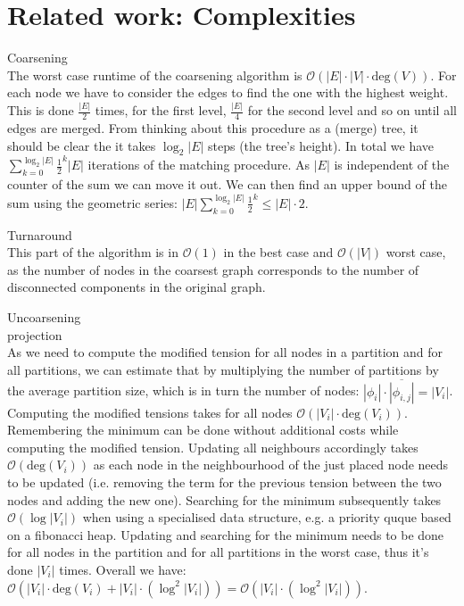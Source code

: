 \section{Related work: Complexities} 
Coarsening \\
    The worst case runtime of the coarsening algorithm is $\mathcal{O}(|E| \cdot |V| \cdot \text{deg}(V))$.
    For each node we have to consider the edges to find the one with the highest weight. 
    This is done $\frac{|E|}{2}$ times, for the first level, $\frac{|E|}{4}$ for the second level and so on until all edges are merged.
    From thinking about this procedure as a (merge) tree, it should be clear the it takes $\log_2 |E|$ steps (the tree's height). 
    In total we have $\sum_{k = 0}^{\log_2 |E|} \frac{1}{2}^k |E|$ iterations of the matching procedure. 
    As $|E|$ is independent of the counter of the sum we can move it out.
    We can then find an upper bound of the sum using the geometric series: $|E| \sum_{k = 0}^{\log_2 |E|} \frac{1}{2}^k \leq |E| \cdot 2$.
    
Turnaround \\
    This part of the algorithm is in $\mathcal{O}(1)$ in the best case and $\mathcal{O}(|V|)$ worst case, as the number of nodes in the coarsest graph corresponds to the number of disconnected components in the original graph.
    
Uncoarsening \\
    projection \\
    As we need to compute the modified tension for all nodes in a partition and for all partitions, we can estimate that by multiplying the number of partitions by the average partition size, which is in turn the number of nodes: $|\phi_i| \cdot \overline{|\phi_{i,j}|} = |V_i|$.
        Computing the modified tensions takes for all nodes $\mathcal{O}(|V_i| \cdot \text{deg}(V_i))$. 
        Remembering the minimum can be done without additional costs while computing the modified tension. 
        Updating all neighbours accordingly takes $\mathcal{O}(\text{deg}(V_i))$ as each node in the neighbourhood of the just placed node needs to be updated (i.e. removing the term for the previous tension between the two nodes and adding the new one).
        Searching for the minimum subsequently takes $\mathcal{O}(\log |V_i|)$ when using a specialised data structure, e.g. a priority quque based on a fibonacci heap.
        Updating and searching for the minimum needs to be done for all nodes in the partition and for all partitions in the worst case, thus it's done $|V_i|$ times.
        Overall we have: $\mathcal{O}(|V_i| \cdot \text{deg}(V_i) + |V_i| \cdot (\log^2 |V_i|)) = \mathcal{O}(|V_i| \cdot (\log^2 |V_i|))$.
        
